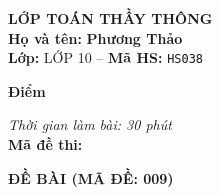 \noindent
\begin{tcolorbox}[colback=white,colframe=black,arc=0mm,boxrule=0.8pt,top=4pt,bottom=4pt,left=6pt,right=6pt]
	\begin{minipage}[c]{0.44\textwidth}
		{\bfseries\large LỚP TOÁN THẦY THÔNG}\\[3pt]
		\textbf{Họ và tên:} \textbf{\large Phương Thảo}\\[3pt]
		\textbf{Lớp:} LỚP 10 \quad -- \quad \textbf{Mã HS:} \texttt{HS038}
	\end{minipage}
	\hfill
	\begin{minipage}[c]{0.22\textwidth}
		\begin{tcolorbox}[colback=white,colframe=black,arc=0mm,boxrule=0.6pt,height=1.8cm,halign=center,valign=top,top=2pt]
			{\bfseries\normalsize Điểm}
		\end{tcolorbox}
	\end{minipage}
	\hfill
	\begin{minipage}[c]{0.30\textwidth}
		\raggedleft
		\textit{Thời gian làm bài: 30 phút}\\[4pt]
		\textbf{Mã đề thi:} 
	\end{minipage}
\end{tcolorbox}
\vspace{0.25cm}

\noindent\textbf{\large ĐỀ BÀI (MÃ ĐỀ: 009)}
\vspace{0.1cm}

